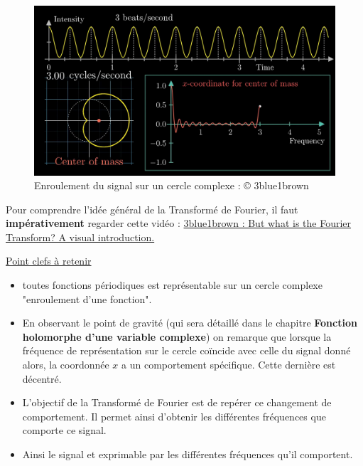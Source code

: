 \documentclass[a4paper]{book}
\begin{document}
\begin{figure}[h]
	\centering
	\includegraphics[scale=0.2]{visu_fourier.jpg}
	\caption{Enroulement du signal sur un cercle
	complexe : © 3blue1brown }
\end{figure}



Pour comprendre l'idée général de la Transformé de Fourier, il faut
\textbf{impérativement} regarder cette vidéo : 
\href{https://www.youtube.com/watch?v=spUNpyF58BY}{3blue1brown : But 
what is the Fourier Transform? A visual introduction.}

\underline{Point clefs à retenir}
\begin{itemize}
	\item toutes fonctions périodiques est représentable sur un cercle
		complexe "enroulement d'une fonction". 
	\item En observant le point de gravité (qui sera détaillé dans le
		chapitre \textbf{Fonction holomorphe d'une variable complexe})
		on remarque que lorsque la fréquence
		de représentation sur le cercle coïncide avec celle du signal
		donné alors, la coordonnée $x$ a un comportement spécifique.
		Cette dernière est décentré.
	\item L'objectif de la Transformé de Fourier est de repérer ce
		changement de comportement. Il permet ainsi d'obtenir les
		différentes fréquences que comporte ce signal.
	\item Ainsi le signal et exprimable par les différentes fréquences qu'il
		comportent.
\end{itemize}
\end{document}
